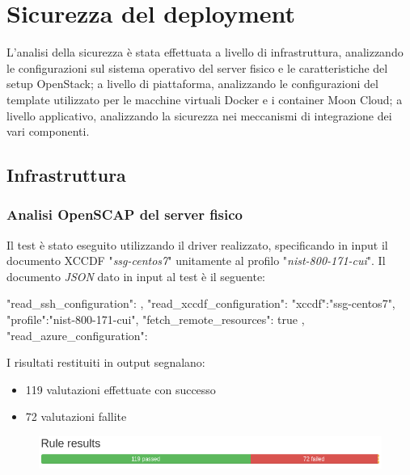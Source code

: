 \documentclass[../main.tex]{subfiles}
\begin{document}
\section{Sicurezza del deployment}
L'analisi della sicurezza è stata effettuata a livello di infrastruttura, analizzando le configurazioni sul sistema operativo del server fisico e le caratteristiche del setup OpenStack; a livello di piattaforma, analizzando le configurazioni del template utilizzato per le macchine virtuali Docker e i container Moon Cloud; a livello applicativo, analizzando la sicurezza nei meccanismi di integrazione dei vari componenti.
\subsection{Infrastruttura}
\subsubsection{Analisi OpenSCAP del server fisico}

Il test è stato eseguito utilizzando il driver realizzato, specificando in input il documento XCCDF "\textit{ssg-centos7}" unitamente al profilo "\textit{nist-800-171-cui}".
Il documento \textit{JSON} dato in input al test è il seguente:
\begin{js}
{
    "read_ssh_configuration": {
    },
    "read_xccdf_configuration": {
        "xccdf":"ssg-centos7",
        "profile":"nist-800-171-cui",
        "fetch_remote_resources": true
    },
    "read_azure_configuration": {
    }
}
\end{js}

I risultati restituiti in output segnalano:
\begin{itemize}
    \item 119 valutazioni effettuate con successo
    \item 72 valutazioni fallite
\end{itemize}
\begin{figure}[H]
    \centering
    \includegraphics[width=15cm]{immagini/test_oscap_1.png}
\end{figure}
\end{document}
